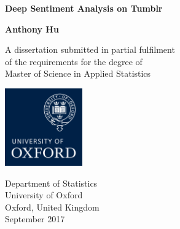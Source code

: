 
\setcounter{page}{1}

\newpage

\thispagestyle{empty}
\begin{center}
  \vspace*{1cm}
  {\Huge \bf Deep Sentiment Analysis on Tumblr}

  \vspace*{2cm}
  {\LARGE\bf Anthony Hu}

  \vfill
  {\large
  A dissertation submitted in partial fulfilment\\ 
  [-3mm] of the requirements for the degree of\\
  [-3mm] Master of Science in Applied Statistics\\}
  \vspace*{0.1cm}
  
   \begin{center}
   \includegraphics[width=0.25\textwidth]{Images/ox_logo.png}
   \end{center}

  {\large
          Department of Statistics\\
          [-3mm] University of Oxford\\
          [-3mm] Oxford, United Kingdom\\
          [1mm]  September 2017}

\end{center}

